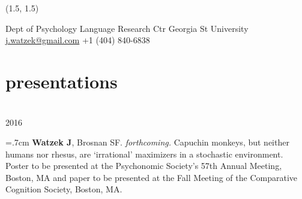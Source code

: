 \documentclass[]{friggeri-cv}
\begin{document}


\renewenvironment{aside}{%
  \let\oldsection\section
  \renewcommand{\section}[1]{
    \par\vspace{\baselineskip}{\Large\headingfont\color{headercolor} ##1}
  }
  \begin{textblock}{3.6}(1.5, 1.5)
  \begin{flushright}
  \obeycr
}{%
  \restorecr
  \end{flushright}
  \end{textblock}
  \let\section\oldsection
}


\begin{aside}
  \section{{\normalfont julia}watzek}
    Dept of Psychology
    Language Research Ctr
    Georgia St University
    ~
    \href{mailto:j.watzek@gmail.com}{j.watzek@gmail.com}
    +1 (404) 840-6838
\end{aside}


\section{presentations}



{\large{} ~\\[-.15cm] 2016}

\hangindent=.7cm \textbf{Watzek J}, Brosnan SF. \emph{forthcoming.} Capuchin monkeys, but neither humans nor rhesus, are `irrational' maximizers in a stochastic environment. Poster to be presented at the Psychonomic Society's 57th Annual Meeting, Boston, MA and paper to be presented at the Fall Meeting of the Comparative Cognition Society, Boston, MA.
\end{document}
